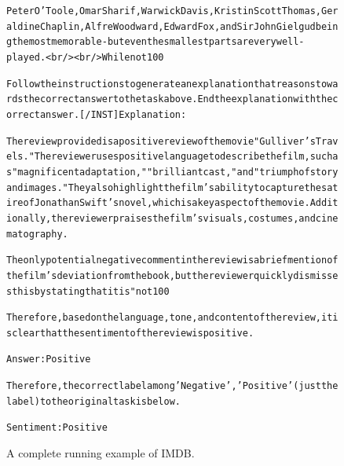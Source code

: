 \begin{figure}[t]
{{\begin{alltt}
Peter O'Toole, Omar Sharif, Warwick Davis, Kristin Scott Thomas, Geraldine Chaplin, Alfre Woodward, Edward Fox, and Sir John Gielgud being the most memorable - but even the smallest parts are very well-played.<br /><br />While not 100%

Follow the instructions to generate an explanation that reasons towards the correct answer to the task above. End the explanation with the correct answer. [/INST] Explanation: 

The review provided is a positive review of the movie "Gulliver's Travels." The reviewer uses positive language to describe the film, such as "magnificent adaptation," "brilliant cast," and "triumph of story and images." They also highlight the film's ability to capture the satire of Jonathan Swift's novel, which is a key aspect of the movie. Additionally, the reviewer praises the film's visuals, costumes, and cinematography.

The only potential negative comment in the review is a brief mention of the film's deviation from the book, but the reviewer quickly dismisses this by stating that it is "not 100%

Therefore, based on the language, tone, and content of the review, it is clear that the sentiment of the review is positive.

Answer: Positive

Therefore, the correct label among {'Negative', 'Positive'} (just the label) to the original task is below.

Sentiment: Positive
\end{alltt}
}}
\caption{A complete running example of IMDB.}
\label{fig:imdb_example}
\end{figure}
